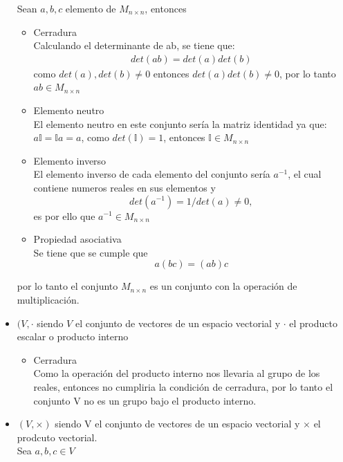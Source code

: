 \documentclass[12pt,letterpaper]{report}
\begin{document}
\begin{itemize}
    Sean $a,b,c$ elemento de $M_{n\times n}$, entonces
    \begin{itemize}
        \item Cerradura\\
        Calculando el determinante de ab, se tiene que:
        \begin{align*}
            det(ab)=det(a)det(b)
        \end{align*}
        como $det(a),det(b)\neq 0$ entonces $det(a)det(b)\neq 0$, por lo tanto $ab \in M_{n\times n}$
        \item Elemento neutro\\
        El elemento neutro en este conjunto sería la matriz identidad ya que: $a\mathbb{I}=\mathbb{I}a=a$, como $det(\mathbb{I})=1$, entonces $\mathbb{I}\in M_{n\times n}$
        \item Elemento inverso\\
        El elemento inverso de cada elemento del conjunto sería $a^{-1}$, el cual contiene numeros reales en sus elementos y 
        \begin{equation*}
            det(a^{-1})=1/det(a)\neq 0,    
        \end{equation*}
        es por ello que $a^{-1}\in M_{n\times n}$
        \item Propiedad asociativa\\
        Se tiene que se cumple que 
        \begin{equation*}
            a(bc)=(ab)c
        \end{equation*}
    \end{itemize}
    por lo tanto el conjunto $M_{n\times n}$ es un conjunto con la operación de multiplicación.
    \item $(V,\cdot$ siendo $V$ el conjunto de vectores de un espacio vectorial y $\cdot$ el producto escalar o producto interno
    \begin{itemize}
        \item Cerradura\\
        Como la operación del producto interno nos llevaria al grupo de los reales, entonces no cumpliria la condición de cerradura, por lo tanto
        el conjunto V no es un grupo bajo el producto interno.
    \end{itemize}
    \item $(V,\times)$ siendo V el conjunto de vectores de un espacio vectorial y $\times$ el prodcuto vectorial.\\
    Sea $a,b,c \in V$
    \begin{itemize}

\end{itemize}
\end{itemize}
\end{document}
